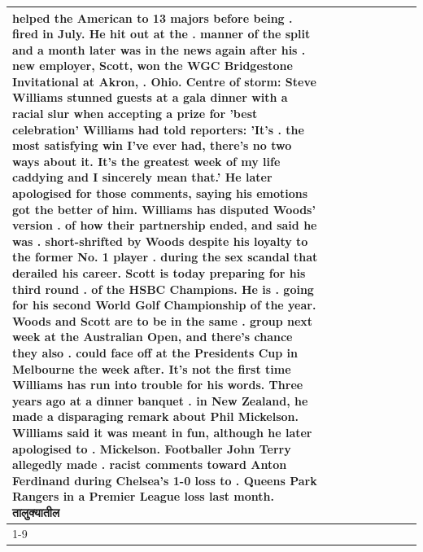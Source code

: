 \begin{table}[H]
\begin{tabular}{lllrlllll}
helped the American to 13 majors before being . fired in July. He hit out at the . manner of the split and a month later was in the news again after his . new employer, Scott, won the WGC Bridgestone Invitational at Akron, . Ohio. Centre of storm: Steve Williams stunned guests at a gala dinner with a racial slur when accepting a prize for 'best celebration' Williams had told reporters: 'It's . the most satisfying win I've ever had, there's no two ways about it. It's the greatest week of my life caddying and I sincerely mean that.' He later apologised for those comments, saying his emotions got the better of him. Williams has disputed Woods' version . of how their partnership ended, and said he was . short-shrifted by Woods despite his loyalty to the former No. 1 player . during the sex scandal that derailed his career. Scott is today preparing for his third round . of the HSBC Champions. He is . going for his second World Golf Championship of the year. Woods and Scott are to be in the same . group next week at the Australian Open, and there's chance they also . could face off at the Presidents Cup in Melbourne the week after. It's not the first time Williams has run into trouble for his words. Three years ago at a dinner banquet . in New Zealand, he made a disparaging remark about Phil Mickelson. Williams said it was meant in fun, although he later apologised to . Mickelson. Footballer John Terry allegedly made . racist comments toward Anton Ferdinand during Chelsea's 1-0 loss to . Queens Park Rangers in a Premier League loss last month. तालुक्यातील \\
\cline{1-9}

\end{tabular}
\end{table}
